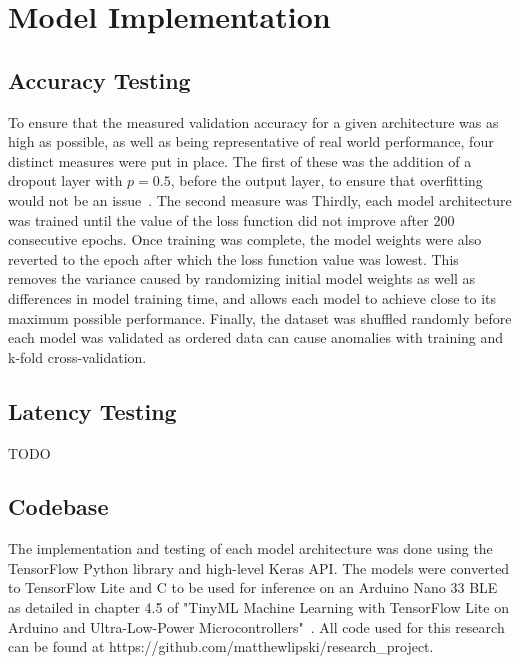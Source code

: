 \section{Model Implementation}\label{sec:model-implementation}
\subsection{Accuracy Testing}\label{subsec:validation-accuracy-testing}
To ensure that the measured validation accuracy for a given architecture was as high as possible, as well as being representative of real world performance, four distinct measures were put in place.
The first of these was the addition of a dropout layer with $p=0.5$, before the output layer, to ensure that overfitting would not be an issue~\cite{JMLR:v15:srivastava14a}.
The second measure was%
Thirdly, each model architecture was trained until the value of the loss function did not improve after 200 consecutive epochs.
Once training was complete, the model weights were also reverted to the epoch after which the loss function value was lowest.
This removes the variance caused by randomizing initial model weights as well as differences in model training time, and allows each model to achieve close to its maximum possible performance.
Finally, the dataset was shuffled randomly before each model was validated as ordered data can cause anomalies with training and k-fold cross-validation.

\subsection{Latency Testing}\label{subsec:latency-testing}
TODO

\subsection{Codebase}\label{subsec:testing-framework}
The implementation and testing of each model architecture was done using the TensorFlow Python library and high-level Keras API\@.
The models were converted to TensorFlow Lite and C to be used for inference on an Arduino Nano 33 BLE as detailed in chapter 4.5 of "TinyML Machine Learning with TensorFlow Lite on Arduino and Ultra-Low-Power Microcontrollers"~\cite{warden2020tinyml}.
All code used for this research can be found at https://github.com/matthewlipski/research\_project.